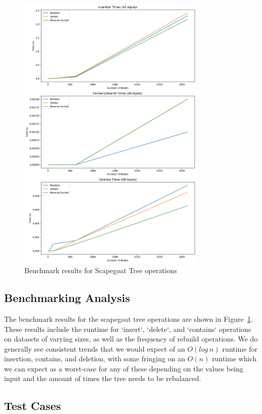\documentclass{labReport}
\begin{document}
\begin{figure}[H]
    \centering
    \includegraphics[width=0.8\textwidth]{benchmarks.png}
    \caption{Benchmark results for Scapegoat Tree operations}
    \label{fig:benchmark}
\end{figure}

\subsection{Benchmarking Analysis}
The benchmark results for the scapegoat tree operations are shown in Figure~\ref{fig:benchmark}. These results include the runtime for `insert`, `delete`, and `contains` operations on datasets of varying sizes, as well as the frequency of rebuild operations. We do generally see consistent trends that we would expect of an $O(log \: n)$ runtime for insertion, contains, and deletion, with some fringing on an $O(n)$ runtime which we can expect as a worst-case for any of these depending on the values being input and the amount of times the tree needs to be rebalanced.

\subsection{Test Cases}


\end{document}
